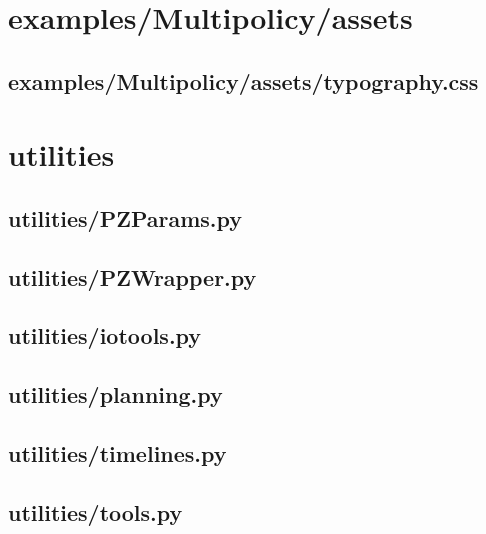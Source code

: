 \documentclass{article}
\begin{document}
\section{examples/Multipolicy/assets}
\subsection[typography.css]{examples/Multipolicy/assets/typography.css}

\newpage

\section{utilities}
\subsection[PZParams.py]{utilities/PZParams.py}

\newpage

\subsection[PZWrapper.py]{utilities/PZWrapper.py}

\newpage

\subsection[iotools.py]{utilities/iotools.py}

\newpage

\subsection[planning.py]{utilities/planning.py}

\newpage

\subsection[timelines.py]{utilities/timelines.py}

\newpage

\subsection[tools.py]{utilities/tools.py}

\newpage
\end{document}
